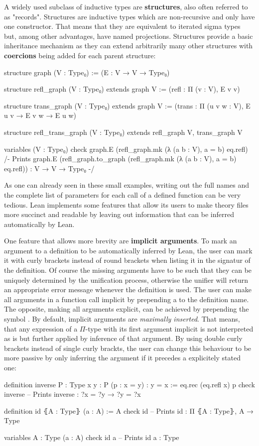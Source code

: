 A widely used subclass of inductive types are \textbf{structures}, also often
referred to as "records".
Structures are inductive types which are non-recursive and only have one constructor.
That means that they are equivalent to iterated sigma types but, among other advantages,
have named projections.
Structures provide a basic inheritance mechanism as they can extend arbitrarily
many other structures with \textbf{coercions} being added for each parent structure:
\begin{leancode}
structure graph (V : Type₀) :=
  (E : V → V → Type₀)

structure refl_graph (V : Type₀) extends graph V :=
  (refl : Π (v : V), E v v)

structure trans_graph (V : Type₀) extends graph V :=
  (trans : Π (u v w : V), E u v → E v w → E u w)

structure refl_trans_graph (V : Type₀) extends refl_graph V, trans_graph V

variables (V : Type₀)
check graph.E (refl_graph.mk (λ (a b : V), a = b) eq.refl)
/- Prints
  graph.E (refl_graph.to_graph 
    (refl_graph.mk (λ (a b : V), a = b) eq.refl)) :
    V → V → Type₀ -/
\end{leancode}

As one can already seen in these small examples, writing out the full names and
the complete list of parameters for each call of a defined function can be very
tedious.
Lean implements some features that allow its users to make theory files more
succinct and readable by leaving out information that can be inferred automatically
by Lean.

One feature that allows more brevity are \textbf{implicit arguments}.
To mark an argument to a definition to be automatically inferred by Lean,
the user can mark it with curly brackets instead of round brackets when listing
it in the signatur of the definition.
Of course the missing arguments have to be such that they can be uniquely determined
by the unification process, otherwise the unifier will return an appropriate error
message whenever the definition is used.
The user can make all arguments in a function call implicit by prepending a
\leani{!} to the definition name.
The opposite, making all arguments explicit, can be achieved by prepending the
symbol .
By default, implicit arguments are \emph{maximally inserted}.
That means, that any expression of a $\Pi$-type with its first argument implicit
is not interpreted as is but further applied by inference of that argument.
By using double curly brackets  instead of single curly brackts,
the user can change this behaviour to be more passive by only inferring the argument
if it precedes a explicitely stated one:
\begin{leancode}
definition inverse {P : Type} {x y : P} (p : x = y) : y = x :=
  eq.rec (eq.refl x) p
check inverse -- Prints inverse : ?x = ?y → ?y = ?x

definition id ⦃A : Type⦄ (a : A) := A
check id -- Prints id : Π ⦃A : Type⦄, A → Type

variables {A : Type} (a : A)
check id a -- Prints id a : Type
\end{leancode}

